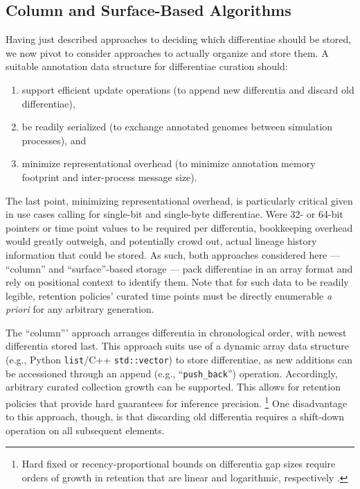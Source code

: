 \subsection{Column and Surface-Based Algorithms}

Having just described approaches to deciding which differentiae should be stored, we now pivot to consider approaches to actually organize and store them.
A suitable annotation data structure for differentiae curation should:
\begin{enumerate}
\item support efficient update operations (to append new differentia and discard old differentiae),
\item be readily serialized (to exchange annotated genomes between simulation processes), and
\item minimize representational overhead (to minimize annotation memory footprint and inter-process message size).
\end{enumerate}

The last point, minimizing representational overhead, is particularly critical given in use cases calling for single-bit and single-byte differentiae.
Were 32- or 64-bit pointers or time point values to be required per differentia, bookkeeping overhead would greatly outweigh, and potentially crowd out, actual lineage history information that could be stored.
As such, both approaches considered here --- ``column'' and ``surface''-based storage --- pack differentiae in an array format and rely on positional context to identify them.
Note that for such data to be readily legible, retention policies' curated time points must be directly enumerable \textit{a priori} for any arbitrary generation.

The ``column''' approach arranges differentia in chronological order, with newest differentia stored last.
This approach suits use of a dynamic array data structure (e.g., Python \texttt{list}/C++ \texttt{std::vector}) to store differentiae, as new additions can be accessioned through an append (e.g., ``\texttt{push\_back}'') operation.
Accordingly, arbitrary curated collection growth can be supported.
This allows for retention policies that provide hard guarantees for inference precision.
\footnote{%
Hard fixed or recency-proportional bounds on differentia gap sizes require orders of growth in retention that are linear and logarithmic, respectively \citep{moreno2024algorithms}.
}
One disadvantage to this approach, though, is that discarding old differentia requires a shift-down operation on all subsequent elements.

